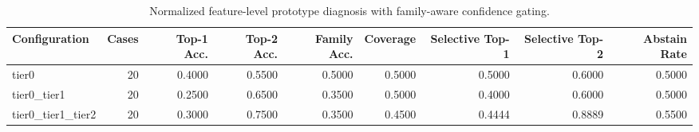 \begin{table}[t]
\centering
\caption{Normalized feature-level prototype diagnosis with family-aware confidence gating.}
\label{tab:dice_stressor_hierarchical_diagnosis}
\footnotesize
\begin{tabular}{lrrrrrrrr}
\toprule
Configuration & Cases & Top-1 Acc. & Top-2 Acc. & Family Acc. & Coverage & Selective Top-1 & Selective Top-2 & Abstain Rate \\
\midrule
tier0 & 20 & 0.4000 & 0.5500 & 0.5000 & 0.5000 & 0.5000 & 0.6000 & 0.5000 \\
tier0_tier1 & 20 & 0.2500 & 0.6500 & 0.3500 & 0.5000 & 0.4000 & 0.6000 & 0.5000 \\
tier0_tier1_tier2 & 20 & 0.3000 & 0.7500 & 0.3500 & 0.4500 & 0.4444 & 0.8889 & 0.5500 \\
\bottomrule
\end{tabular}

\end{table}
